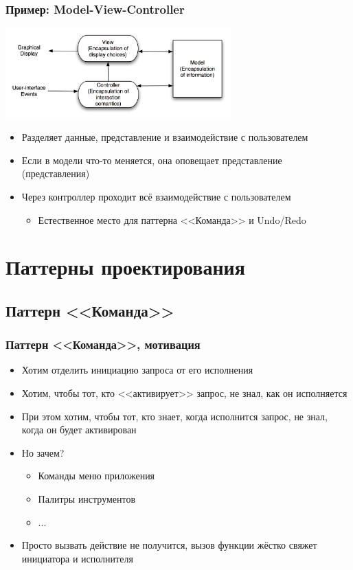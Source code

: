 \documentclass{../../slides-style}
\begin{document}
    \begin{frame}
        \frametitle{Пример: Model-View-Controller}
        \begin{center}
            \includegraphics[width=0.65\textwidth]{mvc.png}
        \end{center}
        \begin{itemize}
            \item Разделяет данные, представление и взаимодействие с пользователем
            \item Если в модели что-то меняется, она оповещает представление (представления)
            \item Через контроллер проходит всё взаимодействие с пользователем
            \begin{itemize}
                \item Естественное место для паттерна <<Команда>> и Undo/Redo
            \end{itemize}
        \end{itemize}
    \end{frame}

    \section{Паттерны проектирования}

    \subsection{Паттерн <<Команда>>}

    \begin{frame}
        \frametitle{Паттерн <<Команда>>, мотивация}
        \begin{itemize}
            \item Хотим отделить инициацию запроса от его исполнения
            \item Хотим, чтобы тот, кто <<активирует>> запрос, не знал, как он исполняется
            \item При этом хотим, чтобы тот, кто знает, когда исполнится запрос, не знал, когда он будет активирован
            \item Но зачем?
            \begin{itemize}
                \item Команды меню приложения
                \item Палитры инструментов
                \item ...
            \end{itemize}
            \item Просто вызвать действие не получится, вызов функции жёстко свяжет инициатора и исполнителя
        \end{itemize}
    \end{frame}
\end{document}
